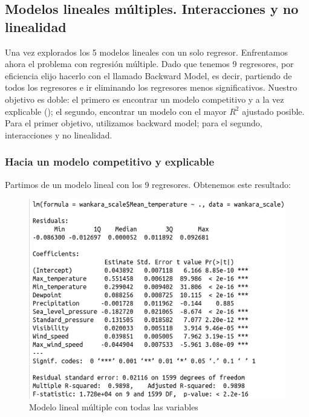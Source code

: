 \subsection{Modelos lineales múltiples. Interacciones y no linealidad}

Una vez explorados los 5 modelos lineales con un solo regresor. Enfrentamos ahora el problema con regresión múltiple. Dado que tenemos 9 regresores, por eficiencia elijo hacerlo con el llamado Backward Model, es decir, partiendo de todos los regresores e ir eliminando los regresores menos significativos. Nuestro objetivo es doble: el primero es encontrar un modelo competitivo y a la vez explicable (\cite{aiexpl}); el segundo, encontrar un modelo con el mayor $R^2$ ajustado posible. Para el primer objetivo, utilizamos backward model; para el segundo, interacciones y no linealidad.

\subsubsection{Hacia un modelo competitivo y explicable}

Partimos de un modelo lineal con los 9 regresores. Obtenemos este resultado:

\begin{figure}[H] %
	\centering
	\includegraphics[scale=0.6]{mlm1.png}  %
	\caption{Modelo lineal múltiple con todas las variables} 
	\label{fig:mlm1}
\end{figure}

